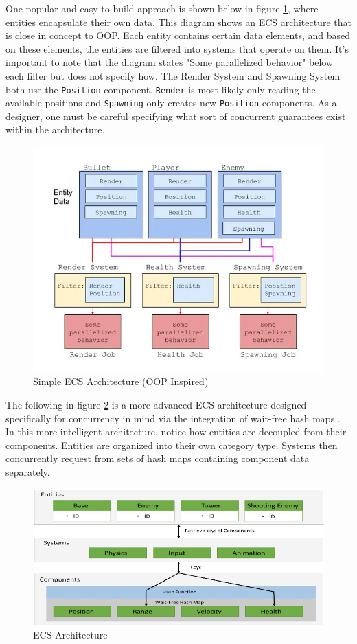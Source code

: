 One popular and easy to build approach is shown below in figure \ref{fig:naive1}, where entities encapsulate their own data. This diagram shows an ECS architecture that is close in concept to OOP. Each entity contains certain data elements, and based on these elements, the entities are filtered into systems that operate on them. It's important to note that the diagram states "Some parallelized behavior" below each filter but does not specify how. The Render System and Spawning System both use the \texttt{Position} component. \texttt{Render} is most likely only reading the available positions and \texttt{Spawning} only creates new \texttt{Position} components. As a designer, one must be careful specifying what sort of concurrent guarantees exist within the architecture. 

\begin{figure}[H]
    \centering
    \includegraphics[width=0.7\linewidth]{resources/naive_ecs2.png}
    \caption{Simple ECS Architecture (OOP Inspired)}
    \label{fig:naive1}
\end{figure}


The following in figure \ref{fig:advanced2} is a more advanced ECS architecture designed specifically for concurrency in mind via the integration of wait-free hash maps \cite{waitfreemapsecs}. In this more intelligent architecture, notice how entities are decoupled from their components. Entities are organized into their own category type. Systems then concurrently request from sets of hash maps containing component data separately.

\begin{figure}[htbp]
    \centering
    \includegraphics[width=0.7\linewidth]{resources/ecs2.png}
    \caption{ECS Architecture}
    \label{fig:advanced2}
\end{figure}

